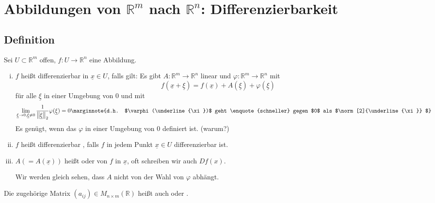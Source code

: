 \section{Abbildungen von $\mathds{R}^m$ nach $\mathds{R}^n$: Differenzierbarkeit} %
\label{sec:7}

\subsection[Definition: Differenzierbarkeit, Differential, Jacobimatrix]{Definition} %
\label{sub:71}
Sei $U  \subset \mathds{R}^m$ offen, $f : U \to \mathds{R}^n$ eine Abbildung.
\begin{enumerate}[(i)]
	\item $f$ heißt differenzierbar in $\underline{x} \in U$, falls gilt: Es gibt $A : \mathds{R}^m \to \mathds{R}^n$ linear und $\varphi : \mathds{R}^m \to \mathds{R}^n$
	mit 
	\[
		\boxed{f(\underline{x} + \underline{\xi}) = f(\underline{x} ) + A (\underline{\xi}) + \varphi (\underline{\xi})} 
	\]
	für alle $\underline{\xi}$ in einer Umgebung von $0$ und mit
	\[
		\lim_{ \underline{\xi} \to 0, \underline{\xi} \not= 0} \frac{1}{\norm[2]{\underline{\xi}} } \varphi (\underline{\xi}) = 0
		 \marginnote{d.h. $\varphi (\underline{\xi})$ geht  \enquote{schneller} gegen $0$ als $\norm[2]{\underline{\xi}} $}
	\]
	Es genügt, wenn das $\varphi$ in einer Umgebung von $0$ definiert ist. \hfill (warum?)
	\item $f$ heißt differenzierbar , falls $f$ in jedem Punkt $\underline{x} \in U$ differenzierbar ist.
	\item $A (= A(\underline{x}))$ heißt  oder  von $f$ in $\underline{x}$, oft schreiben wir auch $D f(x)$. 
	
	Wir werden gleich sehen, dass $A$ nicht von der Wahl von $\varphi$ abhängt.
\end{enumerate}
Die zugehörige Matrix $(a_{ij}) \in M_{n \times m}(\mathds{R})$ heißt auch  oder .  

